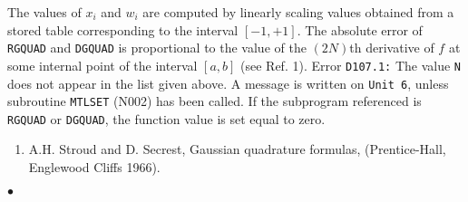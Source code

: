 \Method
The values of $x_i$ and $w_i$ are computed by linearly scaling values
obtained from a stored table corresponding to the interval $[-1,+1]$.
\newpage
\Accuracy
The absolute error of {\tt RGQUAD} and {\tt DGQUAD} is proportional to
the value of the $(2N)$th derivative of $f$ at some internal point
of the interval $[a,b]$ (see Ref. 1).
\Errorh
Error {\tt D107.1:} The value {\tt N} does not appear in the list given
above. A message is written on {\tt Unit 6}, unless subroutine
{\tt MTLSET} (N002) has been called. If the subprogram referenced is
{\tt RGQUAD} or {\tt DGQUAD}, the function value is set equal to zero.
\Refer
\begin{enumerate}
\item A.H. Stroud and D. Secrest, Gaussian quadrature formulas,
(Prentice-Hall, Englewood Cliffs 1966).
\end{enumerate}
$\bullet$
